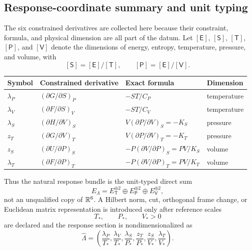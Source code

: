 \subsection{Response-coordinate summary and unit typing}
\label{sec:response-summary}

The six constrained derivatives are collected here because their constraint, formula, and physical dimension are all part of the datum.  Let $[\mathsf E]$, $[\mathsf S]$, $[\mathsf T]$, $[\mathsf P]$, and $[\mathsf V]$ denote the dimensions of energy, entropy, temperature, pressure, and volume, with
\[
[\mathsf S]=[\mathsf E]/[\mathsf T],
\qquad
[\mathsf P]=[\mathsf E]/[\mathsf V].
\]

\begin{center}
\small
\begin{tabular}{p{}p{}p{}p{}}
\toprule
Symbol & Constrained derivative & Exact formula & Dimension\\
\midrule
$\lambda_P$ & $(\partial G/\partial S)_P$ & $-ST/C_P$ & temperature\\
$\lambda_V$ & $(\partial F/\partial S)_V$ & $-ST/C_V$ & temperature\\
$\lambda_S$ & $(\partial H/\partial V)_S$ & $V(\partial P/\partial V)_S=-K_S$ & pressure\\
$z_T$ & $(\partial G/\partial V)_T$ & $V(\partial P/\partial V)_T=-K_T$ & pressure\\
$z_S$ & $(\partial U/\partial P)_S$ & $-P(\partial V/\partial P)_S=PV/K_S$ & volume\\
$\lambda_T$ & $(\partial F/\partial P)_T$ & $-P(\partial V/\partial P)_T=PV/K_T$ & volume\\
\bottomrule
\end{tabular}
\end{center}

Thus the natural response bundle is the unit-typed direct sum
\begin{equation}
E_\Lambda
=E_{\mathsf T}^{\oplus2}
\oplus E_{\mathsf P}^{\oplus2}
\oplus E_{\mathsf V}^{\oplus2},
\label{eq:unit-typed-response-bundle}
\end{equation}
not an unqualified copy of $\mathbb R^6$.  A Hilbert norm, cut, orthogonal frame change, or Euclidean matrix representation is introduced only after reference scales
\[
T_*,\qquad P_*,\qquad V_*>0
\]
are declared and the response section is nondimensionalized as
\begin{equation}
\widehat\Lambda
=
\left(
\frac{\lambda_P}{T_*},
\frac{\lambda_V}{T_*},
\frac{\lambda_S}{P_*},
\frac{z_T}{P_*},
\frac{z_S}{V_*},
\frac{\lambda_T}{V_*}
\right).
\label{eq:nondimensional-response-section}
\end{equation}

